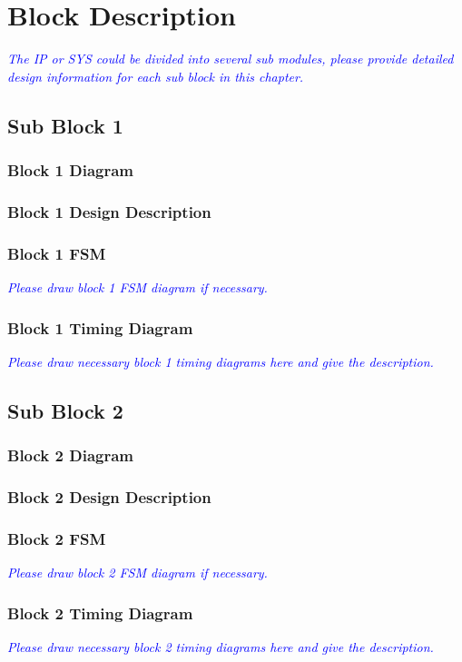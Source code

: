 
\clearpage

\section{Block Description}
\noindent\textit{\textcolor{blue}{The IP or SYS could be divided into several sub modules, please provide detailed design information for each sub block in this chapter.}}

\subsection{Sub Block 1}

\subsubsection{Block 1 Diagram}
\subsubsection{Block 1 Design Description}
\subsubsection{Block 1 FSM}
\noindent\textit{\textcolor{blue}{Please draw block 1 FSM diagram if necessary.}}
\subsubsection{Block 1 Timing Diagram}
\noindent\textit{\textcolor{blue}{Please draw necessary block 1 timing diagrams here and give the description.}}

\subsection{Sub Block 2}
\subsubsection{Block 2 Diagram}
\subsubsection{Block 2 Design Description}
\subsubsection{Block 2 FSM}
\noindent\textit{\textcolor{blue}{Please draw block 2 FSM diagram if necessary.}}
\subsubsection{Block 2 Timing Diagram}
\noindent\textit{\textcolor{blue}{Please draw necessary block 2 timing diagrams here and give the description.}}